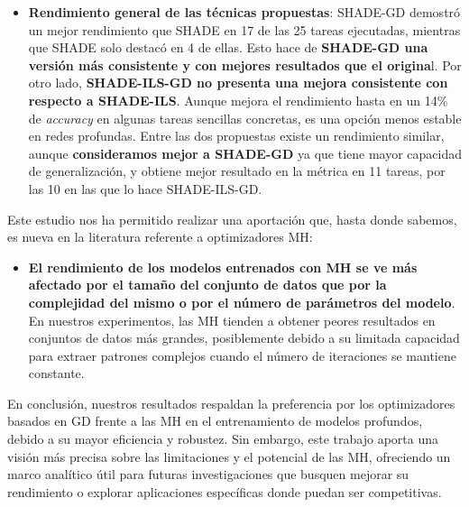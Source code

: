 \begin{itemize}
\item \textbf{Rendimiento general de las técnicas propuestas}: SHADE-GD demostró un mejor rendimiento que SHADE en 17 de las 25 tareas ejecutadas, mientras que SHADE solo destacó en 4 de ellas. Esto hace de \textbf{SHADE-GD una versión más consistente y con mejores resultados que el origina}l. Por otro lado, \textbf{SHADE-ILS-GD no presenta una mejora consistente con respecto a SHADE-ILS}. Aunque mejora el rendimiento hasta en un 14\% de \textit{accuracy} en algunas tareas sencillas concretas, es una opción menos estable en redes profundas. Entre las dos propuestas existe un rendimiento similar, aunque \textbf{consideramos mejor a SHADE-GD} ya que tiene mayor capacidad de generalización, y obtiene mejor resultado en la métrica en 11 tareas, por las 10 en las que lo hace SHADE-ILS-GD.

\end{itemize}

Este estudio nos ha permitido realizar una aportación que, hasta donde sabemos, es nueva en la literatura referente a optimizadores MH:

\begin{itemize}

\item \textbf{El rendimiento de los modelos entrenados con MH se ve más afectado por el tamaño del conjunto de datos que por la complejidad del mismo o por el número de parámetros del modelo}. En nuestros experimentos, las MH tienden a obtener peores resultados en conjuntos de datos más grandes, posiblemente debido a su limitada capacidad para extraer patrones complejos cuando el número de iteraciones se mantiene constante.

\end{itemize}

En conclusión, nuestros resultados respaldan la preferencia por los optimizadores basados en GD frente a las MH en el entrenamiento de modelos profundos, debido a su mayor eficiencia y robustez. Sin embargo, este trabajo aporta una visión más precisa sobre las limitaciones y el potencial de las MH, ofreciendo un marco analítico útil para futuras investigaciones que busquen mejorar su rendimiento o explorar aplicaciones específicas donde puedan ser competitivas.